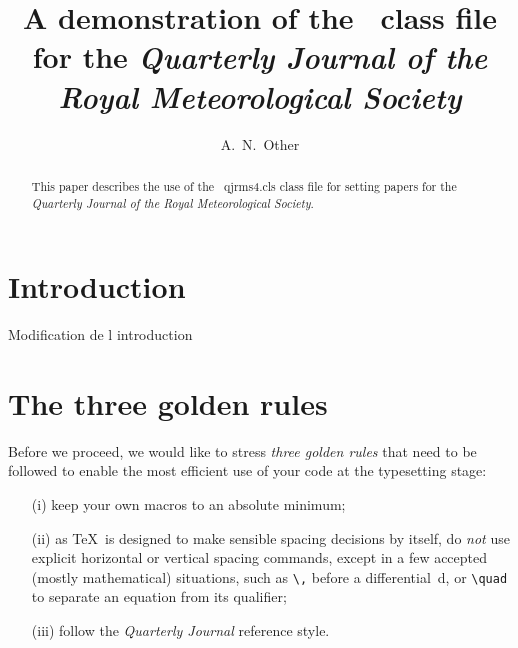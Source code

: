 \documentclass[times]{qjrms4}
\begin{document}

\title{A demonstration of the \LaTeXe\ class file for
the \itshape{Quarterly Journal of the Royal Meteorological
Society}\footnotemark[2]}

\author{A.~N.~Other\corrauth}

\address{John Wiley \& Sons, Ltd, The Atrium, Southern Gate, Chichester,
West Sussex, PO19~8SQ, UK}


\begin{abstract}
This paper describes the use of the \LaTeXe\ \textsf{qjrms4.cls}
class file for setting papers for the \emph{Quarterly Journal of
the Royal Meteorological Society}.
\end{abstract}


\maketitle


\section{Introduction} Modification de l introduction

\section{The three golden rules} Before we proceed, we would like to
stress \emph{three golden rules} that need to be followed to
enable the most efficient use of your code at the typesetting
stage:
\begin{enumerate}
\item[(i)] keep your own macros to an absolute minimum;
\item[(ii)] as \TeX\ is designed to make sensible spacing
decisions by itself, do \emph{not} use explicit horizontal or
vertical spacing commands, except in a few accepted (mostly
mathematical) situations, such as \verb"\," before a
differential~d, or \verb"\quad" to separate an equation from its
qualifier;
\item[(iii)] follow the \emph{Quarterly Journal}
reference style.
\end{enumerate}
\end{document}

